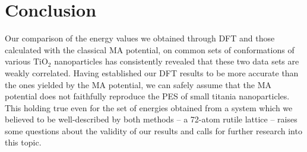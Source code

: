 \documentclass[aps,prb,twocolumn,amsmath,amssymb,superscriptaddress,longbibliography]{revtex4-1}
\newcommand\tab[1][1cm]{\hspace*{#1}} %
\begin{document}
 
 
\section*{Conclusion}


\tab Our comparison of the energy values we obtained through DFT and those calculated with the classical MA potential, on common sets of conformations of various $\text{TiO}_2$ nanoparticles has consistently revealed that these two data sets are weakly correlated.
Having established our DFT results to be more accurate than the ones yielded by the MA potential, we can safely assume that the MA potential does not faithfully reproduce the PES of small titania nanoparticles.
This holding true even for the set of energies obtained from a system which we believed to be well-described by both methods -- a 72-atom rutile lattice -- raises some questions about the validity of our results and calls for further research into this topic.

\end{document}
